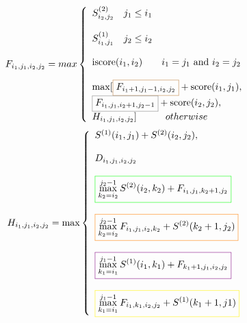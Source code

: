 \begin{equation}
\label{eqn:bpm_recurrence}
F_{i_{1},j_{1}, i_{2}, j_{2}}  =max \left \{\begin{array}{lr}
                 S_{i_{2}, j_{2}}^{(2)}   \hspace{10pt} j_{1}\le i_{1} \\
                 \\
                 S_{i_{1}, j_{1}}^{(1)}   \hspace{10pt} j_{2}\le i_{2} \\
                 \\
                 \text{iscore}(i_{1}, i_{2})   \hspace{20pt}  i_{1} = j_{1} \text{ and }  i_{2} = j_{2} \\
                 \\
                 \max[ \colorboxed{brown}{F_{i_{1}+1, j_{1}-1, i_{2}, j_{2}}} + \text{score}(i_{1}, j_{1}), \\
                      \colorboxed{gray}{F_{i_{1}, j_{1}, i_{2}+1, j_{2}-1}} + \text{score}(i_{2}, j_{2}), \\
                      H_{i_{1},j_{1},i_{2},j_{2}}]   \hspace{30pt}  otherwise
               \end{array}
           \right. \\
\end{equation}
\begin{equation}
\label{eqn:bpm_recurrence_h}
H_{i_{1},j_{1},i_{2},j_{2}} \\ = \max \left \{\begin{array}{lr}
                 S^{(1)}(i_{1}, j_{1})  + S^{(2)}(i_{2}, j_{2}), \\
                 \\
                D_{i_{1},j_{1},i_{2},j_{2}}\\
                 \\
                 \colorboxed{green}{\max\limits_{k_{2}=i_{2}}^{j_{2}-1} S^{(2)}(i_{2}, k_{2}) + F_{i_{1},j_{1}, k_{2}+1, j_{2}}}\\
                 \\
                 \colorboxed{orange}{{\max\limits_{k_{2}=i_{2}}^{j_{2}-1} F_{i_{1},j_{1}, i_{2}, k_{2}} + S^{(2)}(k_{2}+1, j_{2})}}\\
                 \\
                 \colorboxed{violet}{\max\limits_{k_{1}=i_{1}}^{j_{1}-1}  S^{(1)}(i_{1}, k_{1}) + F_{k_{1}+1,j_{1},i_{2}, j_{2}}}\\
                 \\
                 \colorboxed{yellow}{\max\limits_{k_{1}=i_{1}}^{j_{1}-1} F_{i_{1},k_{1}, i_{2}, j_{2}}+ S^{(1)}(k_{1}+1, j{1})} \\
               \end{array}
           \right. \\
\end{equation}
